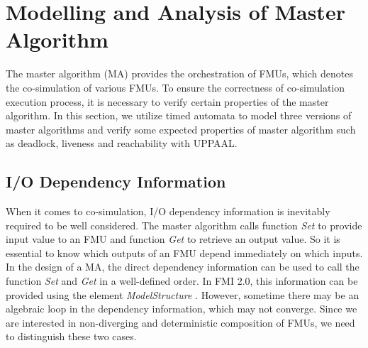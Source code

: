\section{Modelling and Analysis of Master Algorithm}
\label{sec:ma}
The master algorithm (MA) provides the orchestration of FMUs, which denotes the co-simulation of various FMUs. To ensure the correctness of co-simulation execution process, it is necessary to verify certain properties of the master algorithm. In this section, we utilize timed automata to model three versions of master algorithms and verify some expected properties of master algorithm such as deadlock, liveness and reachability with UPPAAL.
\subsection{I/O Dependency Information}
When it comes to co-simulation, I/O dependency information \cite{BromanBGLMTW13} is inevitably required to be well considered. The master algorithm calls function \emph{Set} to provide input value to an FMU and function \emph{Get} to retrieve an output value. So it is essential to know which outputs of an FMU depend immediately on which inputs. In the design of a MA, the direct dependency information can be used to call the function \emph{Set} and \emph{Get} in a well-defined order. In FMI 2.0, this information can be provided using the element \emph{ModelStructure} \cite{FMI2INTRO}. However, sometime there may be an algebraic loop in the dependency information, which may not converge. Since we are interested in non-diverging and deterministic composition of FMUs, we need to distinguish these two cases. 
